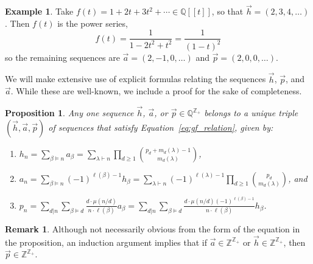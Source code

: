 \documentclass[11pt]{amsart}
\newtheorem{proposition}[theorem]{Proposition}
\theoremstyle{definition}
\newtheorem{example}[theorem]{Example}
\newtheorem{remark}[theorem]{Remark}
\numberwithin{equation}{section}
\def\ZZ{{\mathbb Z}}
\def\QQ{{\mathbb Q}}
\begin{document}
\begin{example}
Take $f(t) = 1 + 2t + 3 t^{2} + \cdots \in \QQ[\![t]\!]$, so that $\vec{h} = (2, 3, 4, \ldots)$.
Then $f(t)$ is the power series,
\[
f(t) = \frac{1}{1 - 2 t^{2} + t^{2}} = \frac{1}{(1-t)^{2}}
\]
so the remaining sequences are $\vec{a} = (2, -1, 0, \ldots)$ and $\vec{p} = (2, 0, 0, \ldots)$.
\end{example}

We will make extensive use of explicit formulas relating the sequences $\vec{h}$, $\vec{p}$, and $\vec{a}$.  While these are well-known, we include a proof for the sake of completeness.

\begin{proposition}
\label{prop:sequences}
Any one sequence $\vec{h}$, $\vec{a}$, or $\vec{p} \in \QQ^{\ZZ_+}$ belongs to a unique triple $(\vec{h}, \vec{a}, \vec{p})$ of sequences that satisfy Equation~\eqref{eq:gf_relation}, given by:
\begin{enumerate}[label = (\roman*), itemsep = 1em]
\item $\displaystyle h_{n}
= \sum_{\beta \vDash n} a_\beta
= \sum_{\lambda \vdash n} \prod_{d \geq 1} \binom{p_d + m_d(\lambda) -1}{m_d(\lambda)}$, 

\item $\displaystyle a_n
= \sum_{\beta \vDash n} (-1)^{\ell(\beta)-1} h_\beta
= \sum_{\lambda \vdash n} (-1)^{\ell(\lambda)-1} \prod_{d \geq 1} \binom{p_d}{m_d(\lambda)}$, and

\item $\displaystyle p_n
= \sum_{d|n} \sum_{\beta \vDash d} \frac{d\cdot \mu(n/d)}{n \cdot \ell(\beta)} a_\beta
= \sum_{d|n} \sum_{\beta \vDash d} \frac{d\cdot \mu(n/d) (-1)^{\ell(\beta)-1}}{n \cdot \ell(\beta)} h_\beta$.

\end{enumerate}
\end{proposition}

\begin{remark} Although not necessarily obvious from the form of the equation in the proposition, 
an induction argument implies that if $\vec{a} \in \ZZ^{\ZZ_+}$ or $\vec{h} \in \ZZ^{\ZZ_+}$,
then $\vec{p} \in \ZZ^{\ZZ_+}$.
\end{remark}
\end{document}

